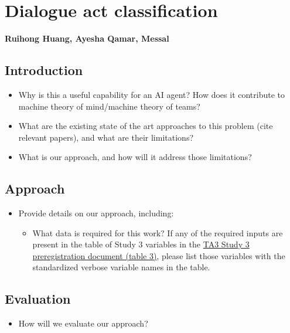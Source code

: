 \chapter{Dialogue act classification}
\textbf{Ruihong Huang, Ayesha Qamar, Messal}

\section{Introduction}
\begin{itemize}
    \item Why is this a useful capability for an AI
        agent? How does it contribute to machine theory of mind/machine theory
        of teams?
    \item What are the existing state of the art approaches to this problem
        (cite relevant papers), and what are their limitations? 
    \item What is our approach, and how will it address those limitations?
\end{itemize}

\section{Approach}
\begin{itemize}
    \item Provide details on our approach, including:
        \begin{itemize}
            \item What data is required for this work? If any of the required
                inputs are present in the table of Study 3 variables in the
                \href{https://docs.google.com/document/d/1GF7VsNF9R95IAaj6mVZUDV2mAX5ok1Bh6Tcm8zDpIkg/edit#heading=h.1ksv4uv}{TA3
                Study 3 preregistration document (table 3)}, please list those
                variables with the standardized verbose variable names in the table.
        \end{itemize}
\end{itemize}

\section{Evaluation}
\begin{itemize}
    \item How will we evaluate our approach?
\end{itemize}
